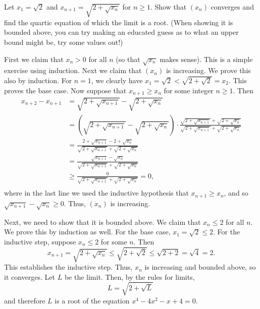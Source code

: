 \documentclass[11pt,dvipsnames]{book}
\numberwithin{equation}{section} %
\numberwithin{figure}{section} %
\numberwithin{table}{section} %
\begin{document}
\begin{exercise} Let $x_{1}=\sqrt{2}$ and $x_{n+1}=\sqrt{2+\sqrt{x_{n}}}$ for $n \geq 1$. Show that $(x_n)$ converges and find the quartic equation of which the limit is a root. (When showing it is bounded above, you can try making an educated guess as to what an upper bound might be, try some values out!)

\begin{solution}
First we claim that $x_n >0$ for all $n$ (so that $\sqrt{x_n}$ makes sense). This is a simple exercise using induction. Next we claim that $(x_{n})$ is increasing. We prove this also by induction. For $n=1$, we clearly have $x_{1}=\sqrt{2}<\sqrt{2+\sqrt{2}}=x_{2}$. This proves the base case. Now suppose that $x_{n+1}\geq x_{n}$ for some integer $n\geq 1$. Then
\begin{align*}
x_{n+2}-x_{n+1}
& =\sqrt{2+\sqrt{x_{n+1}}}-\sqrt{2+\sqrt{x_{n}}}\\
& =\left(\sqrt{2+\sqrt{x_{n+1}}}-\sqrt{2+\sqrt{x_{n}}}\right)\cdot \frac{\sqrt{2+\sqrt{x_{n+1}}}+\sqrt{2+\sqrt{x_{n}}}}{\sqrt{2+\sqrt{x_{n+1}}}+\sqrt{2+\sqrt{x_{n}}}}\\
& = \frac{2+\sqrt{x_{n+1}}-2+\sqrt{x_{n}}}{\sqrt{2+\sqrt{x_{n+1}}}+\sqrt{2+\sqrt{x_{n}}}}\\
& = \frac{\sqrt{x_{n+1}}-\sqrt{x_{n}}}{\sqrt{2+\sqrt{x_{n+1}}}+\sqrt{2+\sqrt{x_{n}}}}\\
& \geq \frac{0}{\sqrt{2+\sqrt{x_{n+1}}}+\sqrt{2+\sqrt{x_{n}}}}=0,\\
\end{align*}
where in the last line we used the inductive hypothesis that $x_{n+1}\geq x_{n}$, and so $\sqrt{x_{n+1}}-\sqrt{x_{n}}\geq 0$. Thus, $(x_{n})$ is increasing.

Next, we need to show that it is bounded above. We claim that $x_{n}\leq 2$ for all $n$. We prove this by induction as well. For the base case, $x_{1}=\sqrt{2}\leq 2$. For the inductive step, suppose $x_{n}\leq 2$ for some $n$. Then
\[
x_{n+1}=\sqrt{2+\sqrt{x_{n}}}\leq \sqrt{2+\sqrt{2}}\leq \sqrt{2+2}=\sqrt{4}=2.
\]
This establishes the inductive step. Thus, $x_{n}$ is increasing and bounded above, so it converges. Let $L$ be the limit. Then, by the rules for limits,
\[L = \sqrt{2+\sqrt{L}}\
\]
and therefore $L$ is a root of the equation $x^4 - 4x^2 -x + 4 = 0$.
\end{solution}
\end{exercise}
\end{document}
